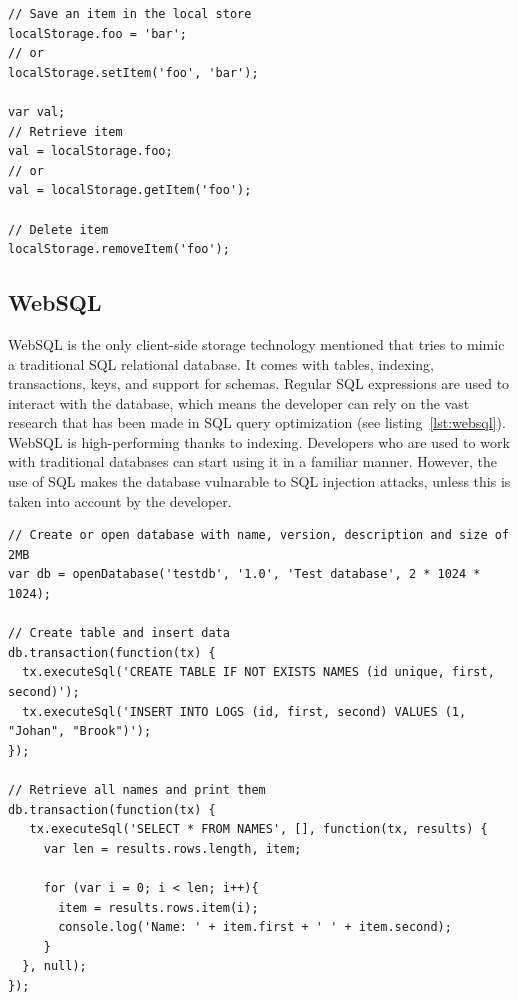 \begin{Code}
\begin{lstlisting}[caption={Use of Web Storage}, label={lst:localStorage}]
// Save an item in the local store
localStorage.foo = 'bar';
// or
localStorage.setItem('foo', 'bar');

var val;
// Retrieve item
val = localStorage.foo;
// or
val = localStorage.getItem('foo');

// Delete item
localStorage.removeItem('foo');
\end{lstlisting}
\end{Code}

\subsection{WebSQL}
\label{sec:websql}
WebSQL is the only client-side storage technology mentioned that tries to mimic a traditional SQL relational database. It comes with tables, indexing, transactions, keys, and support for schemas. Regular SQL expressions are used to interact with the database, which means the developer can rely on the vast research that has been made in SQL query optimization (see listing~\ref{lst:websql}). WebSQL is high-performing thanks to indexing. Developers who are used to work with traditional databases can start using it in a familiar manner. However, the use of SQL makes the database vulnarable to SQL injection attacks, unless this is taken into account by the developer.

\begin{Code}
\begin{lstlisting}[caption={Use of WebSQL}, label={lst:websql}]
// Create or open database with name, version, description and size of 2MB
var db = openDatabase('testdb', '1.0', 'Test database', 2 * 1024 * 1024);

// Create table and insert data
db.transaction(function(tx) {
  tx.executeSql('CREATE TABLE IF NOT EXISTS NAMES (id unique, first, second)');
  tx.executeSql('INSERT INTO LOGS (id, first, second) VALUES (1, "Johan", "Brook")');
});

// Retrieve all names and print them
db.transaction(function(tx) {
   tx.executeSql('SELECT * FROM NAMES', [], function(tx, results) {
     var len = results.rows.length, item;

     for (var i = 0; i < len; i++){
       item = results.rows.item(i);
       console.log('Name: ' + item.first + ' ' + item.second);
     }
  }, null);
});
\end{lstlisting}
\end{Code}

